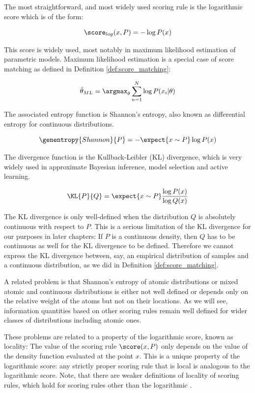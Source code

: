 The most straightforward, and most widely used scoring rule is the logarithmic score which is of the form:

\begin{equation}
	\score_{log}(x,P) = - \log P(x) 
\end{equation}

This score is widely used, most notably in maximum likelihood estimation of parametric models. Maximum likelihood estimation is a special case of score matching as defined in Definition \ref{def:score_matching}:


\begin{equation}
	\hat{\theta}_{ML} = \argmax_{\theta} \sum_{n=1}^{N} \log P(x_i \vert \theta)
\end{equation}


The associated entropy function is Shannon's entropy, also known as differential entropy for continuous distributions.

\begin{equation}
	\genentropy{Shannon}{P} = - \expect{x\sim P} \log P(x)
\end{equation}

The divergence function is the Kullback-Leibler (KL) divergence, which is very widely used in approximate Bayesian inference, model selection and active learning.

\begin{equation}
	\KL{P}{Q} = \expect{x\sim P} \frac{\log P(x)}{\log Q(x)}\label{eqn:KL_divergence}
\end{equation}

The KL divergence is only well-defined when the distribution $Q$ is absolutely continuous with respect to $P$. This is a serious limitation of the KL divergence for our purposes in later chapters: If $P$ is a continuous density, then $Q$ has to be continuous as well for the KL divergence to be defined. Therefore we cannot express the KL divergence between, say, an empirical distribution of samples and a continuous distribution, as we did in Definition \ref{def:score_matching}.

A related problem is that Shannon's entropy of atomic distributions or mixed atomic and continuous distributions is either not well defined or depends only on the relative weight of the atoms but not on their locations. As we will see, information quantities based on other scoring rules remain well defined for wider classes of distributions including atomic ones.

These problems are related to a property of the logarithmic score, known as locality: The value of the scoring rule $\score(x,P)$ only depends on the value of the density function evaluated at the point $x$. This is a unique property of the logarithmic score: any strictly proper scoring rule that is local is analogous to the logarithmic score. Note, that there are weaker definitions of locality of scoring rules, which hold for scoring rules other than the logarithmic \citep{Parry2012, Dawid2012}.

